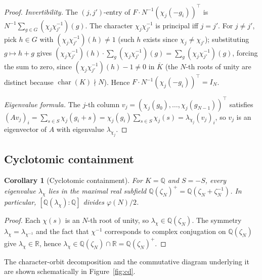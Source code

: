 \documentclass[12pt]{amsart}
\numberwithin{equation}{section}
\theoremstyle{plain}
\newtheorem{corollary}[theorem]{Corollary}
\theoremstyle{definition}
\DeclareMathOperator{\ch}{char}
\newcommand{\Q}{\mathbb{Q}}
\newcommand{\R}{\mathbb{R}}
\begin{document}
\begin{proof}
\emph{Invertibility.}  The $(j,j')$-entry of $F \cdot N^{-1} (\chi_j(-g_i))^\top$
is $N^{-1} \sum_{g \in G} (\chi_j \chi_{j'}^{-1})(g)$.
The character $\chi_j \chi_{j'}^{-1}$ is principal iff $j = j'$.
For $j \ne j'$, pick $h \in G$ with $(\chi_j \chi_{j'}^{-1})(h) \ne 1$
(such $h$ exists since $\chi_j \ne \chi_{j'}$); substituting $g \mapsto h+g$
gives $(\chi_j \chi_{j'}^{-1})(h) \cdot \sum_g (\chi_j \chi_{j'}^{-1})(g)
= \sum_g (\chi_j \chi_{j'}^{-1})(g)$,
forcing the sum to zero, since
$(\chi_j \chi_{j'}^{-1})(h) - 1 \ne 0$ in $\overline{K}$
(the $N$-th roots of unity are distinct because $\ch(K) \nmid N$).
Hence $F \cdot N^{-1}(\chi_j(-g_i))^\top = I_N$.

\emph{Eigenvalue formula.}  The $j$-th column $v_j = (\chi_j(g_0), \ldots,
\chi_j(g_{N-1}))^\top$ satisfies
$(A v_j)_i = \sum_{s \in S} \chi_j(g_i + s)
= \chi_j(g_i) \sum_{s \in S} \chi_j(s)
= \lambda_{\chi_j}(v_j)_i$,
so $v_j$ is an eigenvector of $A$ with eigenvalue $\lambda_{\chi_j}$.
\end{proof}

\subsection{Cyclotomic containment}

\begin{corollary}[Cyclotomic containment]
\label{cor:cyclo}
For $K = \Q$ and $S = -S$, every eigenvalue $\lambda_\chi$ lies in the
maximal real subfield $\Q(\zeta_N)^+ = \Q(\zeta_N + \zeta_N^{-1})$.
In particular, $[\Q(\lambda_\chi) : \Q]$ divides $\varphi(N)/2$.
\end{corollary}

\begin{proof}
Each $\chi(s)$ is an $N$-th root of unity, so $\lambda_\chi \in \Q(\zeta_N)$.
The symmetry $\lambda_\chi = \lambda_{\chi^{-1}}$ and the fact that
$\chi^{-1}$ corresponds to complex conjugation on $\Q(\zeta_N)$ give
$\lambda_\chi \in \R$, hence $\lambda_\chi \in \Q(\zeta_N) \cap \R =
\Q(\zeta_N)^+$.
\end{proof}

The character-orbit decomposition and the commutative diagram underlying
it are shown schematically in Figure~\ref{fig:cd}.
\end{document}
